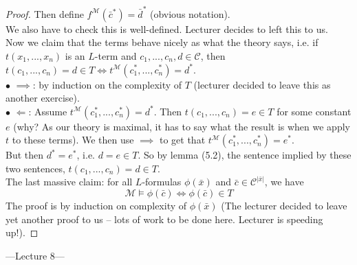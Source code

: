 \documentclass[a4paper]{article}
\begin{document}
\begin{lemma}
\begin{proof}
        Then define $f^{\mathcal{M}}(\bar{c}^*) = \bar{d}^*$ (obvious notation).\\
        We also have to check this is well-defined. Lecturer decides to left this to us.\\
        Now we claim that the terms behave nicely as what the theory says, i.e. if $t(x_1,...,x_n)$ is an $L$-term and $c_1,...,c_n,d \in \mathcal{C}$, then $t(c_1,...,c_n) = d \in T \iff t^{\mathcal{M}} (c_1^*,...,c_n^*) = d^*$.\\
        $\bullet$ $\implies$: by induction on the complexity of $T$ (lecturer decided to leave this as another exercise).\\
        $\bullet$ $\Leftarrow$: Assume $t^{\mathcal{M}} (c_1^*,...,c_n^*) = d^*$. Then $t(c_1,...,c_n) = e \in T$ for some constant $e$ (why? As our theory is maximal, it has to say what the result is when we apply $t$ to these terms). We then use $\implies$ to get that $t^{\mathcal{M}}(c_1^*,...,c_n^*) = e^*$.\\
        But then $d^* = e^*$, i.e. $d = e \in T$. So by lemma (5.2), the sentence implied by these two sentences, $t(c_1,...,c_n) = d \in T$.\\
        The last massive claim: for all $L$-formulas $\phi(\bar{x})$ and $\bar{c} \in \mathcal{C}^{|\bar{x}|}$, we have
        $$\mathcal{M} \vDash \phi(\bar{c}) \iff \phi(\bar{c}) \in T$$
        The proof is by induction on complexity of $\phi(\bar{x})$ (The lecturer decided to leave yet another proof to us -- lots of work to be done here. Lecturer is speeding up!).
    \end{proof}
\end{lemma}

---Lecture 8---
\end{document}

